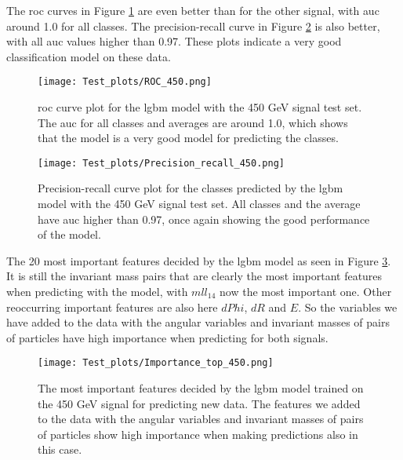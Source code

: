 \documentclass[a4paper, american, 12pt]{report}
\begin{document}
	The \acrshort{roc} curves in Figure \ref{fig:ROCTest_450} are even better than for the other signal, with \acrshort{auc} around 1.0 for all classes. The precision-recall curve in Figure \ref{fig:PrecisionRecallTest_450} is also better, with all \acrshort{auc} values higher than 0.97. These plots indicate a very good classification model on these data.
	\begin{figure}[h!tb!]
		\centering\texttt{[image: Test\_plots/ROC\_450.png]}
		\caption[Test set \acrshort{roc} plot for the \acrshort{lgbm} model trained on the 450 GeV signal.]{\acrshort{roc} curve plot for the \acrshort{lgbm} model with the 450 GeV signal test set. The \acrshort{auc} for all classes and averages are around 1.0, which shows that the model is a very good model for predicting the classes. \label{fig:ROCTest_450}}
	\end{figure}
	\begin{figure}[h!tb]
		\centering\texttt{[image: Test\_plots/Precision\_recall\_450.png]}
		\caption[Test set precision-recall plot for the \acrshort{lgbm} model trained on the 450 GeV signal.]{Precision-recall curve plot for the classes predicted by the \acrshort{lgbm} model with the 450 GeV signal test set. All classes and the average have \acrshort{auc} higher than 0.97, once again showing the good performance of the model. \label{fig:PrecisionRecallTest_450}}
	\end{figure}
	
	The 20 most important features decided by the \acrshort{lgbm} model as seen in Figure \ref{fig:ImpTop_450}. It is still the invariant mass pairs that are clearly the most important features when predicting with the model, with $mll_14$ now the most important one. Other reoccurring important features are also here $dPhi$, $dR$ and $E$. So the variables we have added to the data with the angular variables and invariant masses of pairs of particles have high importance when predicting for both signals.
	\begin{figure}[htb!]
		\centering\texttt{[image: Test\_plots/Importance\_top\_450.png]}
		\caption[Test set most important features of the \acrshort{lgbm} model trained on the 450 GeV signal.]{The most important features decided by the \acrshort{lgbm} model trained on the 450 GeV signal for predicting new data. The features we added to the data with the angular variables and invariant masses of pairs of particles show high importance when making predictions also in this case. \label{fig:ImpTop_450}}
	\end{figure}
	
\end{document}
